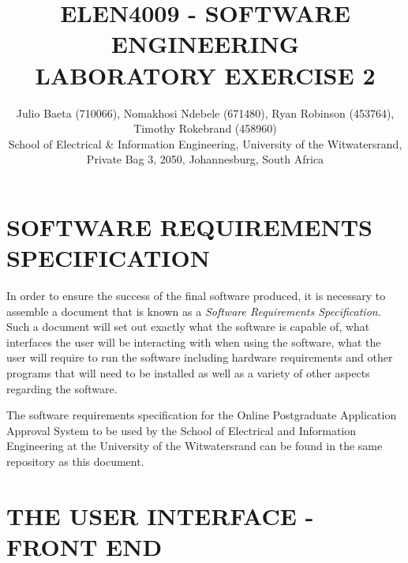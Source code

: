 \documentclass[journal,comsoc]{IEEEtran}
\begin{document}
\title{ELEN4009 - SOFTWARE ENGINEERING\\ LABORATORY EXERCISE 2}

\author{\vspace{3mm} Julio Baeta (710066), Nomakhosi Ndebele (671480), Ryan Robinson (453764), Timothy Rokebrand (458960)\\ \small \vspace{2mm} School of Electrical \& Information Engineering, University of the Witwatersrand, Private Bag 3, 2050, Johannesburg, South Africa
}

\markboth{}{}

\maketitle

\thispagestyle{empty}
\pagestyle{empty}

\IEEEpeerreviewmaketitle


\section{SOFTWARE REQUIREMENTS SPECIFICATION}

\hfill \break In order to ensure the success of the final software produced, it is necessary to assemble a document that is known as a \textit{Software Requirements Specification}. Such a document will set out exactly what the software is capable of, what interfaces the user will be interacting with when using the software, what the user will require to run the software including hardware requirements and other programs that will need to be installed as well as a variety of other aspects regarding the software.

\hfill \break The software requirements specification for the Online Postgraduate Application Approval System to be used by the School of Electrical and Information Engineering at the University of the Witwatersrand can be found in the same repository as this document.


\section{THE USER INTERFACE - FRONT END}
\end{document}
